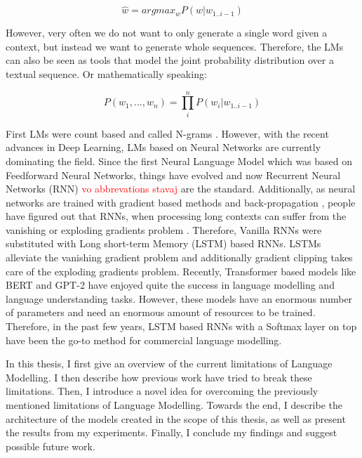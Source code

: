 \begin{displaymath}
    \hat{w} = argmax_w P(w | w_{1..i-1})
\end{displaymath}

However, very often we do not want to only generate a single word given a context, but instead we want to generate whole sequences. Therefore, the LMs can also be seen as tools that model the joint probability distribution over a textual sequence. Or mathematically speaking:

\begin{displaymath}
    P(w_1, ..., w_n) = \prod_i^n P(w_i | w_{1..i-1})
\end{displaymath}

First LMs were count based and called N-grams \citep{martin2009speech}. However, with the recent advances in Deep Learning, LMs based on Neural Networks are currently dominating the field. Since the first Neural Language Model \citep{bengio2003neural} which was based on Feedforward Neural Networks, things have evolved and now Recurrent Neural Networks (RNN) \citep{mikolov2010recurrent} \textcolor{red}{vo abbrevations stavaj} are the standard. Additionally, as neural networks are trained with gradient based methods and back-propagation \citep{rumelhart1988learning}, people have figured out that RNNs, when processing long contexts can suffer from the vanishing or exploding gradients problem \citep{hochreiter1998vanishing, pascanu2012understanding, pascanu2013difficulty}. Therefore, Vanilla RNNs were substituted with Long short-term Memory (LSTM) \citep{hochreiter1997long} based RNNs. LSTMs alleviate the vanishing gradient problem and additionally gradient clipping \citep{pascanu2013difficulty} takes care of the exploding gradients problem. Recently, Transformer \citep{vaswani2017attention} based models like BERT \citep{devlin2018bert} and GPT-2 \citep{radford2019language} have enjoyed quite the success in language modelling and language understanding tasks. However, these models have an enormous number of parameters and need an enormous amount of resources to be trained. Therefore, in the past few years, LSTM based RNNs with a Softmax layer on top have been the go-to method for commercial language modelling.

In this thesis, I first give an overview of the current limitations of Language Modelling. I then describe how previous work have tried to break these limitations. Then, I introduce a novel idea for overcoming the previously mentioned limitations of Language Modelling. Towards the end, I describe the architecture of the models created in the scope of this thesis, as well as present the results from my experiments. Finally, I conclude my findings and suggest possible future work.
